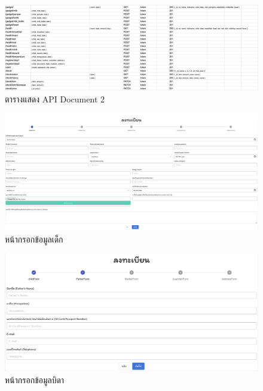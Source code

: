   \begin{landscape}
    \begin{figure}
      \begin{center}
        \includegraphics[width=\linewidth]{images/ApiDocTwo.png}
      \end{center}
      \caption[ตารางแสดง API Document 2]{ตารางแสดง API Document 2}
      \label{fig:ApiDocs2}
    \end{figure}
  \end{landscape}

  \begin{figure}
    \begin{center}
    \includegraphics[width=\linewidth]{images/RegisterForm.png}
    \end{center}
    \caption[หน้ากรอกข้อมูลเด็ก]{หน้ากรอกข้อมูลเด็ก}
    \label{fig:register}
  \end{figure}


  \begin{figure}
    \begin{center}
    \includegraphics[width=\linewidth]{images/fatherForm.png}
    \end{center}
    \caption[หน้ากรอกข้อมูลบิดา]{หน้ากรอกข้อมูลบิดา}
    \label{fig:fatherForm}
  \end{figure}


